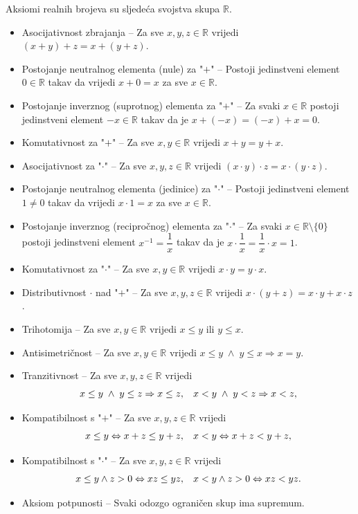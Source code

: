 \begin{remark}
\label{axioms}
Aksiomi realnih brojeva su sljedeća svojstva skupa $\mathbb{R}$.
\begin{itemize}
\item Asocijativnost zbrajanja -- Za sve $x, y, z\in \mathbb{R}$ vrijedi $(x+y)+z=x+(y+z)$.
\item Postojanje neutralnog elementa (nule) za "$+$" -- Postoji jedinstveni element $0\in \mathbb{R}$ takav da vrijedi $x+0=x$ za sve $x\in \mathbb{R}$.
\item Postojanje inverznog (suprotnog) elementa za "$+$" -- Za svaki $x\in \mathbb{R}$ postoji jedinstveni element $-x\in \mathbb{R}$ takav da je $x+(-x)=(-x)+x=0$.
\item Komutativnost za "$+$" -- Za sve $x, y\in \mathbb{R}$ vrijedi $x+y=y+x$.
\item Asocijativnost za "$\cdot$" -- Za sve $x, y, z\in \mathbb{R}$ vrijedi $(x\cdot y)\cdot z=x\cdot (y\cdot z)$.
\item Postojanje neutralnog elementa (jedinice) za "$\cdot$" -- Postoji jedinstveni element $1\neq 0$ takav da vrijedi $x\cdot 1=x$ za sve $x\in \mathbb{R}$.
\item Postojanje inverznog (recipročnog) elementa za "$\cdot$" -- Za svaki $x\in \mathbb{R}\setminus \{0\}$ postoji jedinstveni element $x^{-1}=\dfrac{1}{x}$ takav da je $x\cdot \dfrac{1}{x}=\dfrac{1}{x}\cdot x=1$. 
\item Komutativnost za "$\cdot$" -- Za sve $x, y\in \mathbb{R}$ vrijedi $x\cdot y=y\cdot x$.
\item Distributivnost $\cdot$ nad "$+$" -- Za sve $x, y, z\in \mathbb{R}$ vrijedi $x\cdot (y+z)=x\cdot y+x\cdot z$.
\item Trihotomija -- Za sve \(x, y\in \mathbb{R}\) vrijedi $x\leq y$ ili $y\leq x$.
\item Antisimetričnost -- Za sve \(x, y\in \mathbb{R}\) vrijedi
$x\leq y\; \wedge\; y\leq x\Rightarrow x=y$.
\item Tranzitivnost -- Za sve \(x, y, z\in \mathbb{R}\) vrijedi
\[x\leq y\; \wedge\; y\leq z\Rightarrow x\leq z,\hspace{0.3cm}x< y\; \wedge\; y< z\Rightarrow x< z,\]
\item Kompatibilnost s "\(+\)" -- Za sve \(x, y, z\in \mathbb{R}\) vrijedi
\[x\leq y\Leftrightarrow x+z\leq y+z,\hspace{0.3cm}x< y\Leftrightarrow x+z< y+z,\]
\item Kompatibilnost s "\(\cdot\)" -- Za sve \(x, y, z\in \mathbb{R}\) vrijedi
\[x\leq y\wedge z>0\Leftrightarrow xz\leq yz,\hspace{0.3cm}x< y\wedge z>0\Leftrightarrow xz< yz.\]
\item Aksiom potpunosti -- Svaki odozgo ograničen skup ima supremum.
\end{itemize}
\end{remark}

